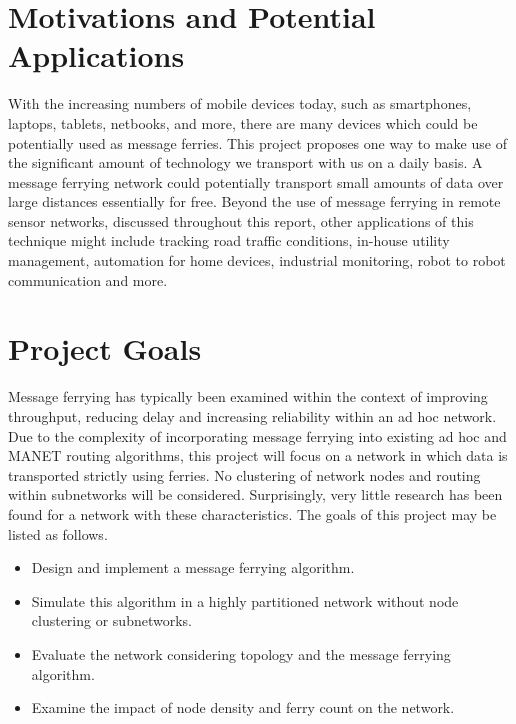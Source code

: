

\section{Motivations and Potential Applications}

With the increasing numbers of mobile devices today, such as smartphones, laptops, tablets, netbooks, and more, there are many devices which could be potentially used as message ferries. 
This project proposes one way to make use of the significant amount of technology we transport with us on a daily basis.
A message ferrying network could potentially transport small amounts of data over large distances essentially for free.
Beyond the use of message ferrying in remote sensor networks, discussed throughout this report, other applications of this technique might include tracking road traffic conditions, in-house utility management, automation for home devices, industrial monitoring, robot to robot communication and more.  


\section{Project Goals}

Message ferrying has typically been examined within the context of improving throughput, reducing delay and increasing reliability within an ad hoc network.
Due to the complexity of incorporating message ferrying into existing ad hoc and MANET routing algorithms, this project will focus on a network in which data is transported strictly using ferries.
No clustering of network nodes and routing within subnetworks will be considered.
Surprisingly, very little research has been found for a network with these characteristics.
The goals of this project may be listed as follows.

\begin{itemize}
\item Design and implement a message ferrying algorithm.
\item Simulate this algorithm in a highly partitioned network without node clustering or subnetworks.
\item Evaluate the network considering topology and the message ferrying algorithm.
\item Examine the impact of node density and ferry count on the network.
\end{itemize}

